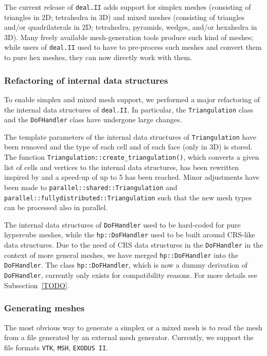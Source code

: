 \documentclass{ansarticle-preprint}
\newcommand{\specialword}[1]{\texttt{#1}}
\newcommand{\dealii}{{\specialword{deal.II}}\xspace}
\begin{document}
The current release of \dealii adds support for simplex meshes (consisting of triangles in 2D; tetrahedra in 3D) and mixed meshes (consisting of triangles and/or 
quadrilaterals in 2D; tetrahedra, pyramids, wedges, and/or hexahedra in 3D). 
Many freely available mesh-generation tools produce such kind of meshes; while users of \dealii used to have to pre-process such meshes and convert them to pure hex meshes, they
can now directly work with them.

\subsubsection{Refactoring of internal data structures}

To enable simplex and mixed mesh support, we performed a major refactoring of the internal data structures of \dealii. In particular, the \texttt{Triangulation} class and 
the \texttt{DoFHandler} class have undergone large changes. 

The template parameters of the internal data structures of \texttt{Triangulation}
have been removed and the type of each cell and of each face (only in 3D) is stored. The function
\texttt{Triangulation::create\_\allowbreak triangulation()}, which converts a given list of
cells and vertices to the internal data structures, has been rewritten 
inspired by \citep{logg09} and a speed-up of up to 5 has been reached. Minor adjustments 
have been made to \texttt{parallel::shared::Triangulation} and \texttt{parallel::\allowbreak fullydistributed::\allowbreak Triangulation} such that 
the new mesh types can be processed also in parallel.

The internal data structures of \texttt{DoFHandler} used to be hard-coded for pure
hypercube meshes, while the \texttt{hp::DoFHandler} used to be built around
CRS-like data structures. Due to the need of CRS data structures in the
\texttt{DoFHandler} in the context of more general meshes, we have merged
\texttt{hp::DoFHandler} into the \texttt{DoFHandler}. The class \texttt{hp::DoFHandler}, which is now a dummy derivation of \texttt{DoFHandler}, currently only exists for compatibility reasons. For
more details see Subsection~\ref{TODO}.

\subsubsection{Generating meshes }

The most obvious way to generate a simplex or a mixed mesh is to read the mesh from a file
generated by an external mesh generator. Currently, we support the 
file formats \texttt{VTK}, \texttt{MSH}, \texttt{EXODUS II}.
\end{document}
